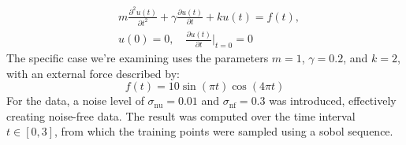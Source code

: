 \documentclass{article}
\begin{document}
\begin{align}
    & m\frac{\partial^2 u(t)}{\partial t^2} + \gamma \frac{\partial u(t)}{\partial t} + k u(t) = f(t), \\
    & u(0) = 0, \quad \frac{\partial u(t)}{\partial t}\bigg|_{t=0} = 0
\end{align}
The specific case we're examining uses the parameters \( m = 1 \), \( \gamma = 0.2 \), and \( k = 2 \), with an external force described by:
\begin{equation}
    f(t) = 10\sin(\pi t)\cos(4\pi t)
\end{equation}
For the data, a noise level of $\sigma_{\text{nu}} = 0.01$ and $\sigma_{\text{nf}} = 0.3$ was introduced, effectively creating noise-free data. The result was computed over the time interval \( t \in [0,3] \), from which the training points were sampled using a sobol sequence. 
\newpage
\end{document}
